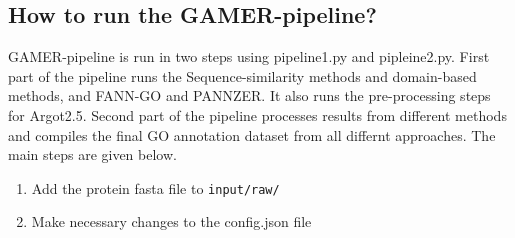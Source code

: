 

\subsection{How to run the
 GAMER-pipeline?}\label{how-to-run-the-gamer-pipeline}

GAMER-pipeline is run in two steps using pipeline1.py and pipleine2.py.
First part of the pipeline runs the Sequence-similarity methods and
domain-based methods, and FANN-GO and PANNZER. It also runs the
pre-processing steps for Argot2.5. Second part of the pipeline processes
results from different methods and compiles the final GO annotation
dataset from all differnt approaches. The main steps are given below.

\begin{enumerate}
 \def\labelenumi{\arabic{enumi}.}

 \item
       Add the protein fasta file to \texttt{input/raw/}
 \item
       Make necessary changes to the config.json file
\end{enumerate}

